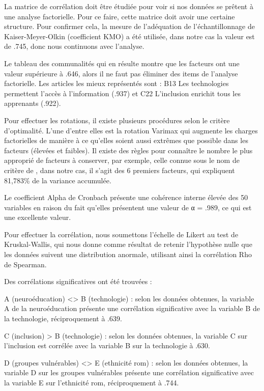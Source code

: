 \documentclass[french]{textolivre}
\begin{document}
La matrice de corrélation doit être étudiée pour voir si nos données se prêtent à une analyse factorielle. Pour ce faire, cette matrice doit avoir une certaine structure. Pour confirmer cela, la mesure de l'adéquation de l'échantillonnage de Kaiser-Meyer-Olkin (coefficient KMO) a été utilisée, dans notre cas la valeur est de .745, donc nous continuons avec l'analyse.

Le tableau des communalités qui en résulte montre que les facteurs ont une valeur supérieure à .646, alors il ne faut pas éliminer des items de l'analyse factorielle. Les articles les mieux représentés sont : B13 Les technologies permettent l'accès à l'information (.937) et C22 L'inclusion enrichit tous les apprenants (.922).

Pour effectuer les rotations, il existe plusieurs procédures selon le critère d'optimalité. L'une d'entre elles est la rotation Varimax qui augmente les charges factorielles de manière à ce qu'elles soient aussi extrêmes que possible dans les facteurs (élevées et faibles). Il existe des règles pour connaître le nombre le plus approprié de facteurs à conserver, par exemple, celle connue sous le nom de critère de \textcite{kaiser_index_1974}, dans notre cas, il s'agit des 6 premiers facteurs, qui expliquent 81,783\% de la variance accumulée.

Le coefficient Alpha de Cronbach présente une cohérence interne élevée des 50 variables en raison du fait qu'elles présentent une valeur de α = .989, ce qui est une excellente valeur.

Pour effectuer la corrélation, nous soumettons l'échelle de Likert au test de Kruskal-Wallis, qui nous donne comme résultat de retenir l'hypothèse nulle que les données suivent une distribution anormale, utilisant ainsi la corrélation Rho de Spearman.

Des corrélations significatives ont été trouvées :

A (neuroéducation) <> B (technologie) : selon les données obtenues, la variable A de la neuroéducation présente une corrélation significative avec la variable B de la technologie, réciproquement à .639.

C (inclusion) > B (technologie) : selon les données obtenues, la variable C sur l'inclusion est corrélée avec la variable B sur la technologie à .630.

D (groupes vulnérables) <> E (ethnicité rom) : selon les données obtenues, la variable D sur les groupes vulnérables présente une corrélation significative avec la variable E sur l'ethnicité rom, réciproquement à .744.
 
\end{document}
